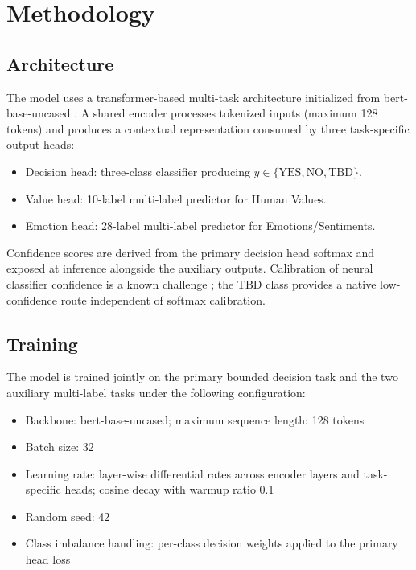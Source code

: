 \documentclass[11pt]{article}
\begin{document}
\section{Methodology}

\subsection{Architecture}

The model uses a transformer-based multi-task architecture initialized from bert-base-uncased
\cite{devlin2019bert}. A shared encoder processes tokenized inputs (maximum 128 tokens) and produces a contextual
representation consumed by three task-specific output heads:

\begin{itemize}
\item Decision head: three-class classifier producing $y \in \{\text{YES}, \text{NO}, \text{TBD}\}$.
\item Value head: 10-label multi-label predictor for Human Values.
\item Emotion head: 28-label multi-label predictor for Emotions/Sentiments.
\end{itemize}

Confidence scores are derived from the primary decision head softmax and exposed at inference
alongside the auxiliary outputs. Calibration of neural classifier confidence is a known challenge
\cite{guo2017calibration}; the TBD class provides a native low-confidence route independent of softmax calibration.

\subsection{Training}

The model is trained jointly on the primary bounded decision task and the two auxiliary multi-label
tasks under the following configuration:

\begin{itemize}
\item Backbone: bert-base-uncased; maximum sequence length: 128 tokens
\item Batch size: 32
\item Learning rate: layer-wise differential rates across encoder layers and task-specific heads; cosine decay with warmup ratio 0.1
\item Random seed: 42
\item Class imbalance handling: per-class decision weights applied to the primary head loss
\end{itemize}
\end{document}
